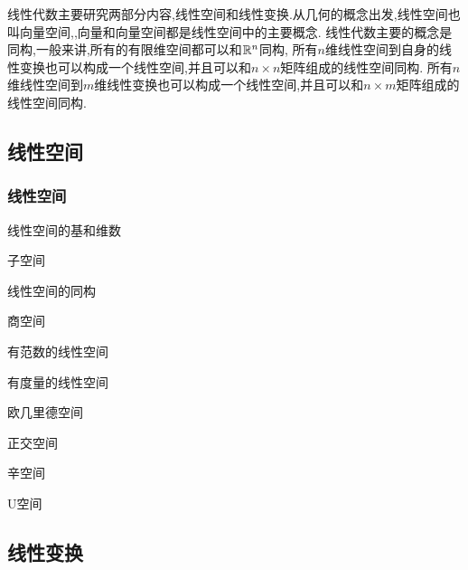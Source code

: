 线性代数主要研究两部分内容,线性空间和线性变换.从几何的概念出发,线性空间也叫向量空间,,向量和向量空间都是线性空间中的主要概念.
线性代数主要的概念是同构,一般来讲,所有的有限维空间都可以和$\mathbb{R}^n$同构,
所有$n$维线性空间到自身的线性变换也可以构成一个线性空间,并且可以和$n \times n$矩阵组成的线性空间同构.
所有$n$维线性空间到$m$维线性变换也可以构成一个线性空间,并且可以和$n \times m$矩阵组成的线性空间同构.

\subsection{线性空间}

\subsubsection{线性空间}

\begin{defination}[线性空间]

\end{defination}

\begin{defination}[向量]

\end{defination}
\begin{defination}[线性子空间]

\end{defination}

线性空间的基和维数

子空间

线性空间的同构

商空间

有范数的线性空间

有度量的线性空间


欧几里德空间

正交空间

辛空间

U空间






\subsection{线性变换}
\begin{defination}[线性变换]

\end{defination}

\begin{defination}[矩阵]

\end{defination}


